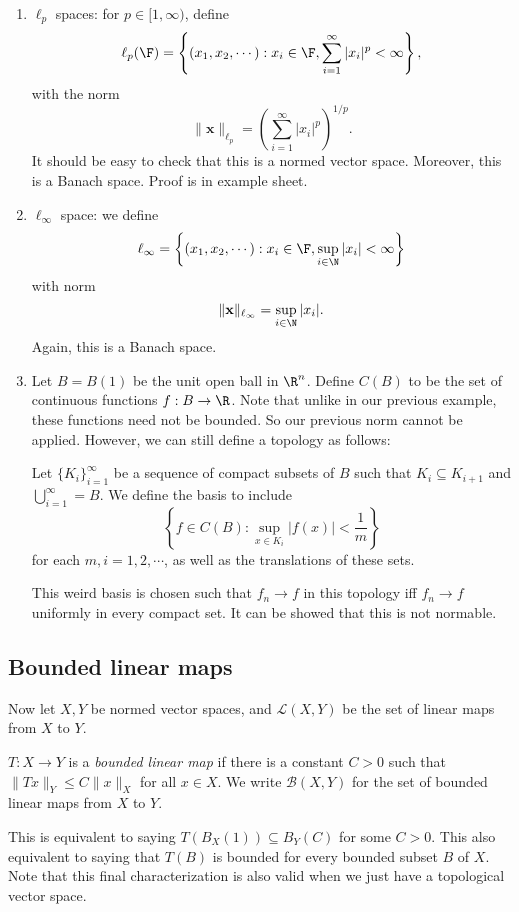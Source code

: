 \documentclass[a4paper]{article}
\begin{document}
\begin{eg}
\begin{enumerate}
    \item $\ell_p$ spaces: for $p\in [1, \infty)$, define
        \[
          \ell_p (\F) = \left\{(x_1, x_2, \cdots): x_i \in \F, \sum_{i = 1}^\infty |x_i|^p < \infty\right\},
        \]
        with the norm
        \[
          \|\mathbf{x}\|_{\ell_p} = \left(\sum_{i = 1}^\infty |x_i|^p\right)^{1/p}.
        \]
        It should be easy to check that this is a normed vector space. Moreover, this is a Banach space. Proof is in example sheet.
      \item $\ell_\infty$ space: we define
        \[
          \ell_\infty = \left\{(x_1, x_2, \cdots): x_i\in \F, \sup_{i\in \N} |x_i| < \infty\right\}
        \]
        with norm
        \[
          \|\mathbf{x}\|_{\ell_\infty} = \sup_{i\in \N}|x_i|.
        \]
        Again, this is a Banach space.
      \item Let $B = B(1)$ be the unit open ball in $\R^n$. Define $C(B)$ to be the set of continuous functions $f: B\to \R$. Note that unlike in our previous example, these functions need not be bounded. So our previous norm cannot be applied. However, we can still define a topology as follows:

        Let $\{K_i\}_{i = 1}^\infty$ be a sequence of compact subsets of $B$ such that $K_i \subseteq K_{i + 1}$ and $\bigcup_{i = 1}^\infty = B$. We define the basis to include
        \[
          \left\{f \in C(B): \sup_{x \in K_i} |f(x)| < \frac{1}{m}\right\}
        \]
        for each $m, i = 1, 2, \cdots$, as well as the translations of these sets.

        This weird basis is chosen such that $f_n \to f$ in this topology iff $f_n \to f$ uniformly in every compact set. It can be showed that this is not normable.
  \end{enumerate}
\end{eg}

\subsection{Bounded linear maps}
Now let $X, Y$ be normed vector spaces, and $\mathcal{L}(X, Y)$ be the set of linear maps from $X$ to $Y$.

\begin{defi}
  $T: X\to Y$ is a \emph{bounded linear map} if there is a constant $C > 0$ such that $\|Tx\|_Y \leq C\|x\|_X$ for all $x\in X$. We write $\mathcal{B}(X, Y)$ for the set of bounded linear maps from $X$ to $Y$.
\end{defi}
This is equivalent to saying $T(B_X(1)) \subseteq B_Y(C)$ for some $C > 0$. This also equivalent to saying that $T(B)$ is bounded for every bounded subset $B$ of $X$. Note that this final characterization is also valid when we just have a topological vector space.
\end{document}
